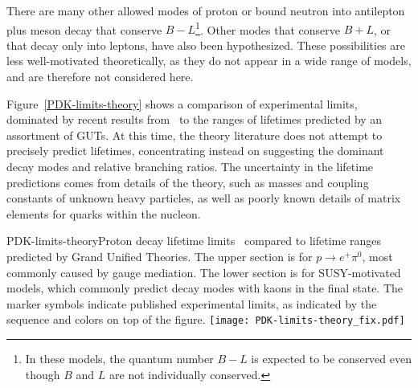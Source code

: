 There are many other allowed modes of proton or bound neutron into
antilepton plus meson decay that conserve $B-L$\footnote{In these
  models, the quantum number $B-L$ is expected to be conserved even
  though $B$ and $L$ are not individually conserved.}. 
Other modes that conserve $B+L$, or that decay only into leptons,  
have also been hypothesized. 
These possibilities are less well-motivated theoretically, as
they do not appear in a wide range of models, and are therefore not considered
here.

Figure~\ref{PDK-limits-theory} shows a comparison of experimental
limits, dominated by recent results from \superk\ to the
ranges of lifetimes predicted by an assortment of GUTs. At this time,
the theory literature does not attempt to precisely predict lifetimes,
concentrating instead on suggesting the dominant decay modes and
relative branching ratios. The uncertainty in the lifetime
predictions comes from details of the theory, such as masses and
coupling constants of unknown heavy particles, as well as poorly known
details of matrix elements for quarks within the nucleon.

\begin{cdrfigure}{PDK-limits-theory}{Proton decay lifetime
limits~\cite{Beringer:1900zz,Nishino:2012ipa} compared to lifetime ranges
  predicted by Grand Unified Theories. The upper section is for
  $p \rightarrow e^+ \pi^0$, most commonly caused by gauge mediation.
  The lower section is for SUSY-motivated models, which commonly
  predict decay modes with kaons in the final state. The
  marker symbols indicate published experimental limits, as indicated
  by the sequence and colors on top of the figure.}
\texttt{[image: PDK-limits-theory\_fix.pdf]}
\end{cdrfigure}


